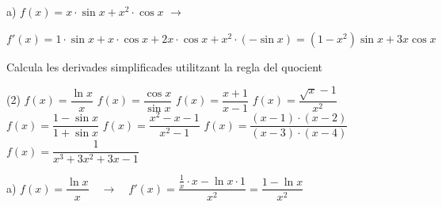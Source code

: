 \begin{example}
	a) $f(x)=x\cdot \sin x + x^2\cdot \cos x$ \qquad $\rightarrow$
	
	\quad $f'(x)=1\cdot \sin x + x\cdot \cos x + 2x\cdot \cos x+ x^2\cdot (-\sin x)=(1-x^2)\sin x+3x\cos x$
\end{example}

\begin{mylist}
		
	\exer[1] Calcula les derivades simplificades utilitzant la regla del quocient
	
	\begin{tasks}(2)
		\task $f(x)=\dfrac{\ln x}{x}$
		\task $f(x)=\dfrac{\cos x}{\sin x}$
		\task $f(x)=\dfrac{x+1}{x-1}$
		\task $f(x)=\dfrac{\sqrt{x}-1}{x^2}$
		\task $f(x)=\dfrac{1-\sin x}{1+\sin x}$
		\task $f(x)=\dfrac{x^2-x-1}{x^2-1}$
		\task $f(x)=\dfrac{(x-1)\cdot(x-2)}{(x-3)\cdot (x-4)}$
		\task $f(x)=\dfrac{1}{x^3+3x^2+3x-1}$
	\end{tasks}
\answers[cols=1]{[$y'=\dfrac{1 - \ln x  }{x^2}$, $y'=\dfrac{-1}{\sin^2 x}$, $y'=\dfrac{-2}{(x-1)^2}$, $y'=\dfrac{4x-3\sqrt{x^3}}{2x^4}$, $y'=\dfrac{-2\cos x}{(1+\sin x)^2}$,  $y'=\dfrac{x^2+1}{(x^2-1)^2}$, $y'=\dfrac{-4 \; x^{2} + 20 \; x - 22}{(x-3)^2 (x-4)^2}$, $y'=\dfrac{-3 \; x^{2} - 6 \; x - 3}{(x^3+3x^2+3x-1)^2}$]}

\end{mylist}
\begin{example}
	a) $f(x)=\dfrac{\ln x}{x}  \quad \rightarrow \quad f'(x)=\dfrac{\frac{1}{x}\cdot x - \ln x \cdot 1 }{x^2}=\dfrac{1 - \ln x  }{x^2}$ 
	\vspace{0.5cm}
\end{example}


